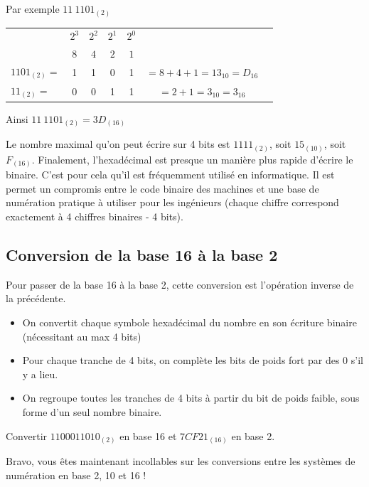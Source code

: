 \newpage
Par exemple $11~1101_{(2)}$
\begin{center}
\begin{tabular}{lcccccr}
    & $2^3$ & $2^2$ & $2^1$ & $2^0$\\
    & $8$ & $4$ & $2$ & $1$ &\\
    \hline
    $1101_{(2)} = $ & 1 & 1 & 0 & 1 & $=8+4+1=13_{10}=D_{16}$\\
    $11_{(2)} = $  & 0 & 0 & 1 & 1& $=2+1=3_{10}=3_{16}$\\
    \end{tabular}
\end{center}
Ainsi $11~1101_{(2)} = 3D_{(16)}$
\\[-1cm]
\begin{Comprendre}
    Le nombre maximal qu'on peut écrire sur 4 bits est $1111_{(2)}$, soit $15_{(10)}$, soit $F_{(16)}$. Finalement, l'hexadécimal est presque un manière plus rapide d'écrire le binaire. C'est pour cela qu'il est fréquemment utilisé en informatique. Il est permet un compromis entre le code binaire des machines et une base de numération pratique à utiliser pour les ingénieurs (chaque chiffre correspond exactement à 4 chiffres binaires - 4 bits).
\end{Comprendre}

\subsection{Conversion de la base 16 à la base 2}
Pour passer de la base 16 à la base 2, cette conversion est l'opération inverse de la précédente.
\begin{itemize}
    \item On convertit chaque symbole hexadécimal du nombre en son écriture binaire (nécessitant au max 4 bits)
    \item Pour chaque tranche de 4 bits, on complète les bits de poids fort par des 0 s'il y a lieu.
    \item On regroupe toutes les tranches de 4 bits à partir du bit de poids faible, sous forme d'un seul nombre binaire.\\
\end{itemize}


\begin{Avous}
Convertir $1100011010_{(2)}$ en base 16 et $7CF21_{(16)}$ en base 2.\\
    \vspace{8cm}
\end{Avous}


\centering
{\huge{
Bravo, vous êtes maintenant incollables sur les conversions entre les systèmes de numération en base 2, 10 et 16 !}}

